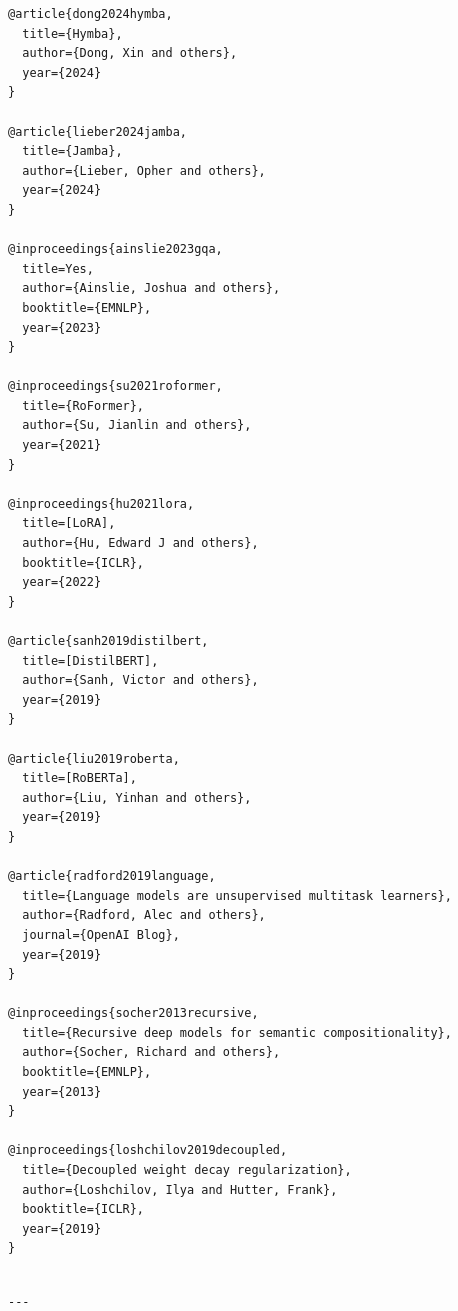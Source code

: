 \begin{lstlisting}
@article{dong2024hymba,
  title={Hymba},
  author={Dong, Xin and others},
  year={2024}
}

@article{lieber2024jamba,
  title={Jamba},
  author={Lieber, Opher and others},
  year={2024}
}

@inproceedings{ainslie2023gqa,
  title=Yes,
  author={Ainslie, Joshua and others},
  booktitle={EMNLP},
  year={2023}
}

@inproceedings{su2021roformer,
  title={RoFormer},
  author={Su, Jianlin and others},
  year={2021}
}

@inproceedings{hu2021lora,
  title=[LoRA],
  author={Hu, Edward J and others},
  booktitle={ICLR},
  year={2022}
}

@article{sanh2019distilbert,
  title=[DistilBERT],
  author={Sanh, Victor and others},
  year={2019}
}

@article{liu2019roberta,
  title=[RoBERTa],
  author={Liu, Yinhan and others},
  year={2019}
}

@article{radford2019language,
  title={Language models are unsupervised multitask learners},
  author={Radford, Alec and others},
  journal={OpenAI Blog},
  year={2019}
}

@inproceedings{socher2013recursive,
  title={Recursive deep models for semantic compositionality},
  author={Socher, Richard and others},
  booktitle={EMNLP},
  year={2013}
}

@inproceedings{loshchilov2019decoupled,
  title={Decoupled weight decay regularization},
  author={Loshchilov, Ilya and Hutter, Frank},
  booktitle={ICLR},
  year={2019}
}
\end{lstlisting}
\begin{lstlisting}

---
\end{lstlisting}